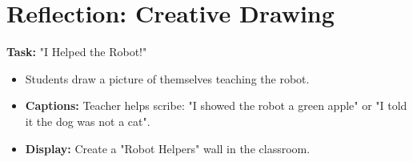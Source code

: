 \documentclass[11pt, a4paper]{article}
\begin{document}
\section{Reflection: Creative Drawing}
\textbf{Task:} "I Helped the Robot!"
\begin{itemize}
    \item Students draw a picture of themselves teaching the robot.
    \item \textbf{Captions:} Teacher helps scribe: "I showed the robot a green apple" or "I told it the dog was not a cat".
    \item \textbf{Display:} Create a "Robot Helpers" wall in the classroom.
\end{itemize}
\end{document}
